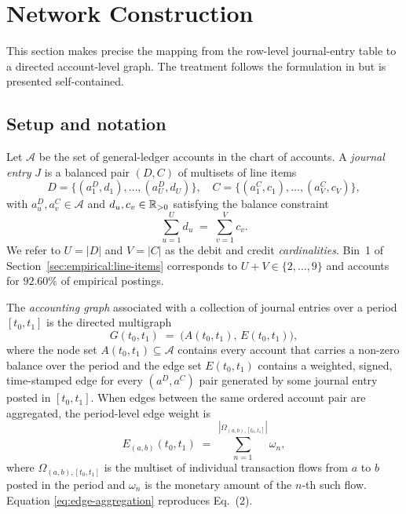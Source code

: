 \section{Network Construction}
\label{sec:network}

This section makes precise the mapping from the row-level
journal-entry table to a directed account-level graph.  The
treatment follows the formulation in
\citet{ivertowski2024apn} but is presented self-contained.

\subsection{Setup and notation}
\label{sec:network:setup}

Let $\mathcal{A}$ be the set of general-ledger accounts in the
chart of accounts.  A \emph{journal entry} $J$ is a balanced pair
$(D,C)$ of multisets of line items
\[
  D = \{(a^D_1, d_1), \ldots, (a^D_U, d_U)\},
  \quad
  C = \{(a^C_1, c_1), \ldots, (a^C_V, c_V)\},
\]
with $a^D_u, a^C_v \in \mathcal{A}$ and $d_u, c_v \in \mathbb{R}_{>0}$
satisfying the balance constraint
\begin{equation}
  \sum_{u=1}^{U} d_u \;=\; \sum_{v=1}^{V} c_v. \label{eq:balance}
\end{equation}
We refer to $U = |D|$ and $V = |C|$ as the debit and credit
\emph{cardinalities}.  Bin~1 of
Section~\ref{sec:empirical:line-items} corresponds to
$U + V \in \{2, \ldots, 9\}$ and accounts for
$92.60\%$ of empirical postings.

The \emph{accounting graph} associated with a collection of journal
entries over a period $[t_0, t_1]$ is the directed multigraph
\begin{equation}
  G(t_0, t_1) \;=\; \big( A(t_0, t_1),\, E(t_0, t_1) \big),
  \label{eq:graph}
\end{equation}
where the node set $A(t_0, t_1) \subseteq \mathcal{A}$ contains
every account that carries a non-zero balance over the period and
the edge set $E(t_0, t_1)$ contains a weighted, signed,
time-stamped edge for every $(a^D, a^C)$ pair generated by some
journal entry posted in $[t_0, t_1]$.  When edges between the same
ordered account pair are aggregated, the period-level edge weight is
\begin{equation}
  E_{(a,b)}(t_0, t_1) \;=\; \sum_{n=1}^{|\Omega_{(a,b),[t_0,t_1]}|}
                                \omega_n, \label{eq:edge-aggregation}
\end{equation}
where $\Omega_{(a,b),[t_0,t_1]}$ is the multiset of individual
transaction flows from $a$ to $b$ posted in the period and
$\omega_n$ is the monetary amount of the $n$-th such flow.  Equation
\eqref{eq:edge-aggregation} reproduces \citet{ivertowski2024apn}
Eq.~(2).


